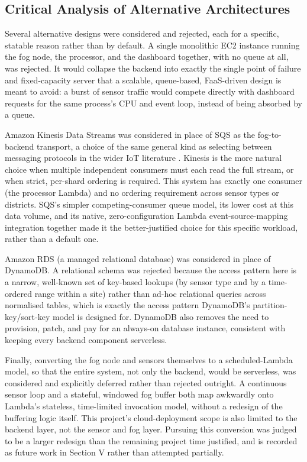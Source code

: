 \documentclass[conference]{IEEEtran}
\begin{document}
\subsection{Critical Analysis of Alternative Architectures}
Several alternative designs were considered and rejected, each for a specific, statable reason rather than by default. A single monolithic EC2 instance running the fog node, the processor, and the dashboard together, with no queue at all, was rejected. It would collapse the backend into exactly the single point of failure and fixed-capacity server that a scalable, queue-based, FaaS-driven design is meant to avoid: a burst of sensor traffic would compete directly with dashboard requests for the same process's CPU and event loop, instead of being absorbed by a queue.

Amazon Kinesis Data Streams was considered in place of SQS as the fog-to-backend transport, a choice of the same general kind as selecting between messaging protocols in the wider IoT literature \cite{ref16}. Kinesis is the more natural choice when multiple independent consumers must each read the full stream, or when strict, per-shard ordering is required. This system has exactly one consumer (the processor Lambda) and no ordering requirement across sensor types or districts. SQS's simpler competing-consumer queue model, its lower cost at this data volume, and its native, zero-configuration Lambda event-source-mapping integration together made it the better-justified choice for this specific workload, rather than a default one.

Amazon RDS (a managed relational database) was considered in place of DynamoDB. A relational schema was rejected because the access pattern here is a narrow, well-known set of key-based lookups (by sensor type and by a time-ordered range within a site) rather than ad-hoc relational queries across normalised tables, which is exactly the access pattern DynamoDB's partition-key/sort-key model is designed for. DynamoDB also removes the need to provision, patch, and pay for an always-on database instance, consistent with keeping every backend component serverless.

Finally, converting the fog node and sensors themselves to a scheduled-Lambda model, so that the entire system, not only the backend, would be serverless, was considered and explicitly deferred rather than rejected outright. A continuous sensor loop and a stateful, windowed fog buffer both map awkwardly onto Lambda's stateless, time-limited invocation model, without a redesign of the buffering logic itself. This project's cloud-deployment scope is also limited to the backend layer, not the sensor and fog layer. Pursuing this conversion was judged to be a larger redesign than the remaining project time justified, and is recorded as future work in Section V rather than attempted partially.
\end{document}
